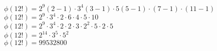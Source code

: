 \documentclass[12pt]{scrartcl}
\begin{document}
$\phi(12!) = 2^9 (2 - 1) \cdot 3^4 (3-1)  \cdot 5 (5-1) \cdot (7-1) \cdot (11 - 1)$\\
$\phi(12!) = 2^9 \cdot 3^4 \cdot 2 \cdot 6 \cdot 4 \cdot 5 \cdot 10$\\
$\phi(12!) = 2^9 \cdot 3^4 \cdot 2 \cdot 2 \cdot 3 \cdot 2^2 \cdot 5 \cdot 2 \cdot 5$\\
$\phi(12!) = 2^{14} \cdot 3^5 \cdot 5^2$\\
$\phi(12!) = 99532800$








% 
\end{document}
